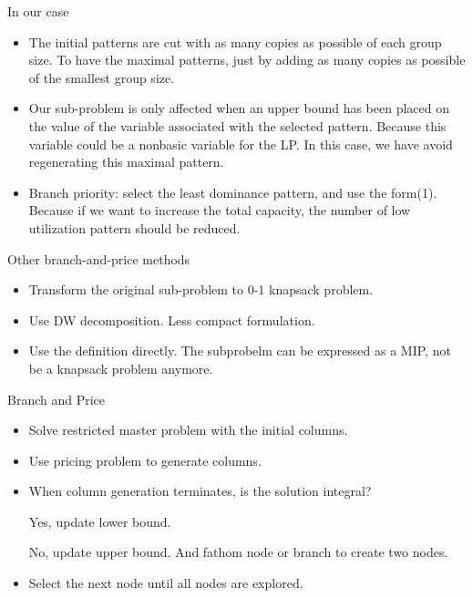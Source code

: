     \begin{frame}{In our case}
      \begin{itemize}
        \item The initial patterns are cut with as many copies as possible of each group size. To have the maximal patterns, just by adding as many copies as possible of the smallest group size.
        \item Our sub-problem is only affected when an upper bound has been placed on the value of the variable associated with the selected pattern. Because this variable could be a nonbasic variable for the LP. In this case, we have avoid regenerating this maximal pattern.
        \item Branch priority: select the least dominance pattern, and use the form(1). Because if we want to increase the total capacity, the number of low utilization pattern should be reduced.
      \end{itemize}
    \end{frame}

    \begin{frame}{Other branch-and-price methods}
      \begin{itemize}
        \item Transform the original sub-problem to 0-1 knapsack problem.
        \item Use DW decomposition. Less compact formulation.
        \item Use the definition directly. The subprobelm can be expressed as a MIP, not be a knapsack problem anymore.
      \end{itemize}
    \end{frame}

    \begin{frame}{Branch and Price}
        \begin{itemize}
          \item Solve restricted master problem with the initial columns.
          \item Use pricing problem to generate columns.
          \item When column generation terminates, is the solution integral?

          Yes, update lower bound.

          No, update upper bound. And fathom node or branch to create two nodes.
          \item Select the next node until all nodes are explored.
        \end{itemize}
    \end{frame}

